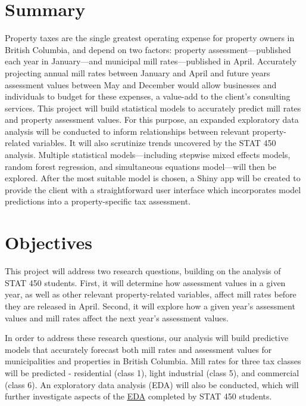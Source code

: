 \documentclass{article}
\begin{document}
\printtitle

\section*{Summary}

Property taxes are the single greatest operating expense for property owners in British Columbia, and depend on two factors: property assessment---published each year in January---and municipal mill rates---published in April. Accurately projecting annual mill rates between January and April and future years assessment values between May and December would allow businesses and individuals to budget for these expenses, a value-add to the client's consulting services. This project will build statistical models to accurately predict mill rates and property assessment values. For this purpose, an expanded exploratory data analysis will be conducted to inform relationships between relevant property-related variables. It will also scrutinize trends uncovered by the STAT 450 analysis. Multiple statistical models---including stepwise mixed effects models, random forest regression, and simultaneous equations model---will then be explored. After the most suitable model is chosen, a Shiny app will be created to provide the client with a straightforward user interface which incorporates model predictions into a property-specific tax assessment.


\section{Objectives}

This project will address two research questions, building on the analysis of STAT 450 students. First, it will determine how assessment values in a given year, as well as other relevant property-related variables, affect mill rates before they are released in April. Second, it will explore how a given year's assessment values and mill rates affect the next year's assessment values.


In order to address these research questions, our analysis will build predictive models that accurately forecast both mill rates and assessment values for municipalities and properties in British Columbia. Mill rates for three tax classes will be predicted - residential (class 1), light industrial (class 5), and commercial (class 6).  An exploratory data analysis (EDA) will also be conducted, which will further investigate aspects of the \href{https://github.com/STAT450-550/RealEstate/blob/450/src/2nd_draft.pdf}{\color{blue} \underline{EDA}} completed by STAT 450 students. 
\end{document}
